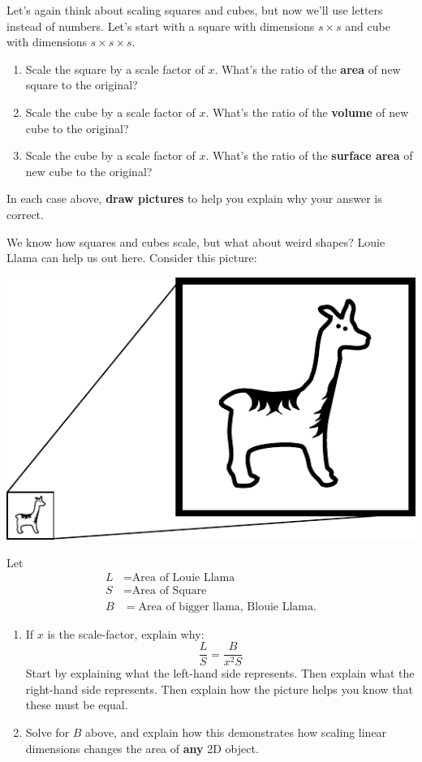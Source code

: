 \documentclass[handout,nooutcomes,noauthor,hints,12pt]{ximera}
\begin{document}
\begin{question}
  Let's again think about scaling squares and cubes, but now we'll use
  letters instead of numbers.  Let's start with a square with
  dimensions $s\times s$ and cube with dimensions $s\times s\times s$.
  \begin{enumerate}
  \item Scale the square by a scale factor of $x$. What's the ratio of the \textbf{area} of new square to the original?
  \item Scale the cube by a scale factor of $x$. What's the ratio of the \textbf{volume} of new cube to the original?
  \item Scale the cube by a scale factor of $x$. What's the ratio of the \textbf{surface area} of new cube to the original?
  \end{enumerate}
  In each case above, \textbf{draw pictures} to help you explain why your
  answer is correct.
\end{question}
\mynewpage

\begin{question}
  We know how squares and cubes scale, but what about weird shapes?
  Louie Llama can help us out here.  Consider this picture:
  \begin{center}
    \includegraphics{llamaScaled.pdf}
  \end{center}
  Let
  \begin{align*}
    L &= \text{Area of Louie Llama}\\
    S &= \text{Area of Square}\\
    B &= \text{Area of bigger llama, Blouie Llama}.
  \end{align*}
  \begin{enumerate}
  \item If $x$ is the scale-factor, explain why:
    \[
    \frac{L}{S} = \frac{B}{x^2 S}
    \]
    Start by explaining what the left-hand side represents. Then
    explain what the right-hand side represents. Then explain how the
    picture helps you know that these must be equal.
  \item Solve for $B$ above, and explain how this demonstrates how
    scaling linear dimensions changes the area of \textbf{any} 2D object.
  \end{enumerate}
  
\end{question}
\end{document}
